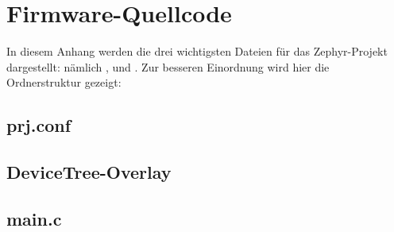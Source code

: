 \section{Firmware-Quellcode}

In diesem Anhang werden die drei wichtigsten Dateien für das Zephyr-Projekt dargestellt: nämlich ,
 und . Zur besseren Einordnung wird hier die Ordnerstruktur gezeigt: 

\begin{figure}[htbp]
    \centering
    \begin{minipage}{0.8\textwidth} %
    \end{minipage}
\end{figure}

\subsection{prj.conf}



\subsection{DeviceTree-Overlay}



\subsection{main.c}

 

